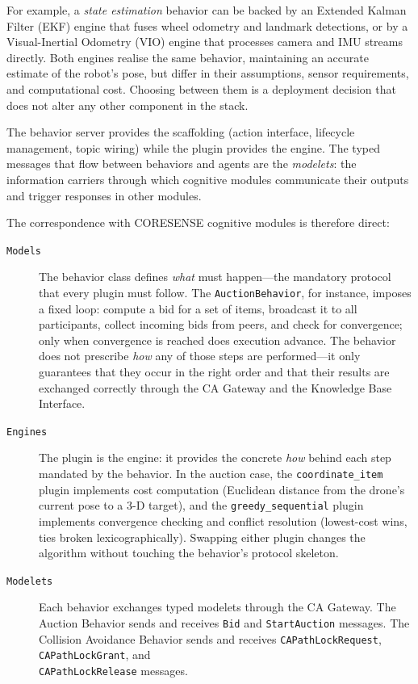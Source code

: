 \documentclass[deliverable]{csreport}
\renewcommand{\code}[1]{\texttt{\textcolor{CSMaroon}{#1}}}%
\newcommand{\tcode}[1]{\texttt{\textcolor{CSMaroon}{#1}}}
\begin{document}
For example, a \emph{state estimation} behavior can be backed by an Extended Kalman Filter (EKF) engine that fuses wheel odometry and landmark detections, or by a Visual-Inertial Odometry (VIO) engine that processes camera and IMU streams directly. Both engines realise the same behavior, maintaining an accurate estimate of the robot's pose, but differ in their assumptions, sensor requirements, and computational cost. Choosing between them is a deployment decision that does not alter any other component in the stack.

The behavior server provides the scaffolding (action interface, lifecycle management, topic wiring) while the plugin provides the engine. The typed messages that flow between behaviors and agents are the \emph{modelets}: the information carriers through which cognitive modules communicate their outputs and trigger responses in other modules.

The correspondence with CORESENSE cognitive modules is therefore direct:

\begin{description}
  \item[\tcode{Models}] The behavior class defines \emph{what} must happen---the mandatory protocol that every plugin must follow. The \code{AuctionBehavior}, for instance, imposes a fixed loop: compute a bid for a set of items, broadcast it to all participants, collect incoming bids from peers, and check for convergence; only when convergence is reached does execution advance. The behavior does not prescribe \emph{how} any of those steps are performed---it only guarantees that they occur in the right order and that their results are exchanged correctly through the CA Gateway and the Knowledge Base Interface.
  \item[\tcode{Engines}] The plugin is the engine: it provides the concrete \emph{how} behind each step mandated by the behavior. In the auction case, the \code{coordinate\_item} plugin implements cost computation (Euclidean distance from the drone's current pose to a 3-D target), and the \code{greedy\_sequential} plugin implements convergence checking and conflict resolution (lowest-cost wins, ties broken lexicographically). Swapping either plugin changes the algorithm without touching the behavior's protocol skeleton.
  \item[\tcode{Modelets}] Each behavior exchanges typed modelets through the CA Gateway. The Auction Behavior sends and receives \code{Bid} and \code{StartAuction} messages. The Collision Avoidance Behavior sends and receives \code{CAPathLockRequest}, \code{CAPathLockGrant}, and \\ \code{CAPathLockRelease} messages.
\end{description}
\end{document}
